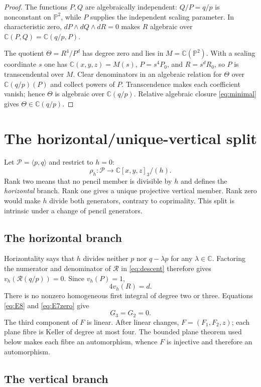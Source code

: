 \documentclass[11pt]{article}
\theoremstyle{remark}
\newcommand{\C}{\mathbb C}
\newcommand{\PP}{\mathbb P}
\begin{document}
\begin{proof}
The functions $P,Q$ are algebraically independent: $Q/P=q/p$ is
nonconstant on $\PP^2$, while $P$ supplies the independent scaling
parameter.  In characteristic zero,
$dP\wedge dQ\wedge dR=0$ makes $R$ algebraic over
$\C(P,Q)=\C(q/p,P)$.

The quotient $\Theta=R^4/P^d$ has degree zero and lies in
$M=\C(\PP^2)$.  With a scaling coordinate $s$ one has
$\C(x,y,z)=M(s)$, $P=s^4P_0$, and $R=s^dR_0$, so $P$ is
transcendental over $M$.  Clear denominators in an algebraic relation for
$\Theta$ over $\C(q/p)(P)$ and collect powers of $P$.  Transcendence makes
each coefficient vanish; hence $\Theta$ is algebraic over $\C(q/p)$.
Relative algebraic closure \eqref{eq:minimal} gives
$\Theta\in\C(q/p)$.
\end{proof}

\section{The horizontal/unique-vertical split}

Let $\mathcal P=\langle p,q\rangle$ and restrict to $h=0$:
\[
 \rho_h:\mathcal P\longrightarrow\C[x,y,z]_3/(h).
\]
Rank two means that no pencil member is divisible by $h$ and defines the
\emph{horizontal} branch.  Rank one gives a unique projective vertical
member.  Rank zero would make $h$ divide both generators, contrary to
coprimality.  This split is intrinsic under a change of pencil generators.

\subsection{The horizontal branch}

Horizontality says that $h$ divides neither $p$ nor $q-\lambda p$ for any
$\lambda\in\C$.  Factoring the numerator and denominator of $\mathcal R$
in \eqref{eq:descent} therefore gives
$v_h(\mathcal R(q/p))=0$.  Since $v_h(P)=1$,
\[
 4v_h(R)=d.
\]
There is no nonzero homogeneous first integral of degree two or three.
Equations \eqref{eq:E8} and \eqref{eq:E7zero} give
\[
 G_3=G_2=0.
\]
The third component of $F$ is linear.  After linear changes,
$F=(F_1,F_2,z)$; each plane fibre is Keller of degree at most four.
The bounded plane theorem used below makes each fibre an automorphism,
whence $F$ is injective and therefore an automorphism.

\subsection{The vertical branch}
\end{document}
